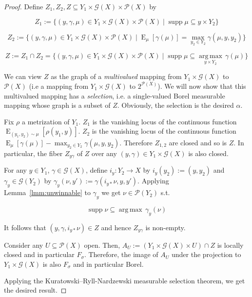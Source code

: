 \documentclass[11pt]{article}
\theoremstyle{definition}
\theoremstyle{plain}
\newcommand{\Argmax}[1]{\underset{#1}{\operatorname{arg\,max}}\,}
\DeclareMathOperator{\E}{E}
\newcommand{\PM}{\mathcal{P}}
\DeclareMathOperator{\Sp}{supp}
\newcommand{\Gm}{\mathcal{G}}
\begin{document}
\begin{proof}

Define ${Z_1, Z_2, Z \subseteq Y_1 \times \Gm(X) \times \PM(X)}$ by

$${Z_1:=\{(y,\gamma,\mu) \in Y_1 \times \Gm(X) \times \PM(X) \mid \Sp \mu \subseteq y \times Y_2\}}$$

$${Z_2:=\{(y,\gamma,\mu) \in Y_1 \times \Gm(X) \times \PM(X) \mid \E_\mu[\gamma(\mu)] = \max_{y_2 \in Y_2} \gamma(\mu,y,y_2)\}}$$

$${Z:=Z_1 \cap Z_2 =\{(y,\gamma,\mu) \in Y_1 \times \Gm(X) \times \PM(X) \mid \Sp \mu \subseteq \Argmax{y \times Y_2} \gamma(\mu)\}}$$

We can view ${Z}$ as the graph of a \emph{multivalued} mapping from ${Y_1 \times \Gm(X)}$ to ${\PM(X)}$ (i.e a mapping from ${Y_1 \times \Gm(X)}$ to $2^{\PM(X)}$). We will now show that this multivalued mapping has a \emph{selection}, i.e. a single-valued Borel measurable mapping whose graph is a subset of $Z$. Obviously, the selection is the desired ${\alpha}$.

Fix $\rho$ a metrization of $Y_1$. $Z_1$ is the vanishing locus of the continuous function $\E_{(y_1, y_2) \sim \mu}[\rho(y_1,y)]$. $Z_2$ is the vanishing locus of the continuous function $\E_\mu[\gamma(\mu)] - \max_{y_2 \in Y_2} \gamma(\mu,y,y_2)$. Therefore $Z_{1,2}$ are closed and so is $Z$. In particular, the fiber ${Z_{y\gamma}}$ of ${Z}$ over any ${(y,\gamma) \in Y_1 \times \Gm(X)}$ is also closed. 

For any ${y \in Y_1}$, ${\gamma \in \Gm(X)}$, define ${i_y: Y_2 \rightarrow X}$ by ${i_y(y_2):=(y,y_2)}$ and ${\gamma_y \in \Gm(Y_{2})}$ by $\gamma_y(\nu,y'):=\gamma(i_{y*}\nu,y,y')$. Applying Lemma~\ref{lmm:unwinnable} to ${\gamma_y}$ we get ${\nu \in \PM(Y_2)}$ s.t.

$$\Sp \nu \subseteq \Argmax{} \gamma_y(\nu)$$

It follows that ${(y,\gamma,i_{y*}\nu) \in Z}$ and hence ${Z_{y\gamma}}$ is non-empty.

Consider any ${U \subseteq \PM(X)}$ open. Then, ${A_U:=(Y_{1} \times \Gm(X) \times U) \cap Z}$ is locally closed and in particular ${F_\sigma}$. Therefore, the image of ${A_U}$ under the projection to ${Y_{1} \times \Gm(X)}$ is also ${F_\sigma}$ and in particular Borel. 

Applying the Kuratowski--Ryll-Nardzewski measurable selection theorem, we get the desired result.

\end{proof}
\end{document}
